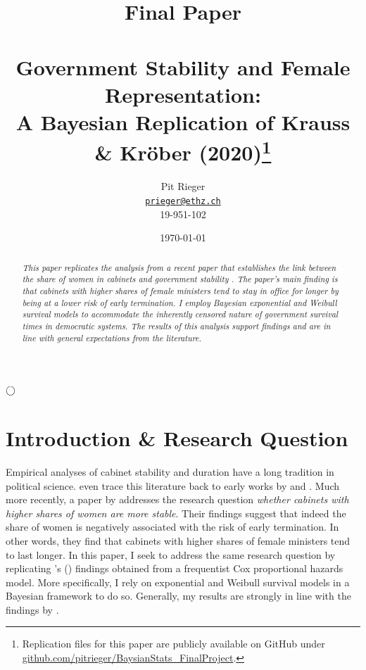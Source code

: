 \documentclass[11pt]{article}
\title{\large Final Paper \\ ~ \\
\LARGE  Government Stability and Female Representation:\\
A Bayesian Replication of Krauss \& Kröber (2020)\footnote[1]{Replication files for this paper are publicly available on GitHub under \url{github.com/pitrieger/BaysianStats_FinalProject}.}}
\author{Pit Rieger\\
    \href{mailto:prieger@ethz.ch}{\texttt{prieger@ethz.ch}}\\
    19-951-102}
\date{\today}
\newcommand\possecite[1]{\citeauthor{#1}'s (\citeyear{#1})}
\begin{document}
\maketitle

\bigskip
\bigskip
\bigskip
\bigskip
\begin{center}
    $\Huge \bigcirc$
\end{center}
\bigskip
\bigskip
\bigskip
\bigskip

\begin{abstract}
{\noindent\itshape
This paper replicates the analysis from a recent paper that establishes the link between the share of women in cabinets and government stability \parencite{KK20}. The paper's main finding is that cabinets with higher shares of female ministers tend to stay in office for longer by being at a lower risk of early termination. I employ Bayesian exponential and Weibull survival models to accommodate the inherently censored nature of government survival times in democratic systems. The results of this analysis support \textcite{KK20} findings and are in line with general expectations from the literature.
}
\end{abstract}

\bigskip
\bigskip
\bigskip
\bigskip

\newpage


\section{Introduction \& Research Question}
Empirical analyses of cabinet stability and duration have a long tradition in political science. \textcite{LupiaStrøm1995} even trace this literature back to early works by \textcite{Bryce1921} and \textcite{Lowell1896}. Much more recently, a paper by \textcite{KK20} addresses the research question \textit{whether cabinets with higher shares of women are more stable}. Their findings suggest that indeed the share of women is negatively associated with the risk of early termination. In other words, they find that cabinets with higher shares of female ministers tend to last longer. In this paper, I seek to address the same research question by replicating \possecite{KK20} findings obtained from a frequentist Cox proportional hazards model. More specifically, I rely on exponential and Weibull survival models in a Bayesian framework to do so. Generally, my results are strongly in line with the findings by \textcite{KK20}.
\end{document}
